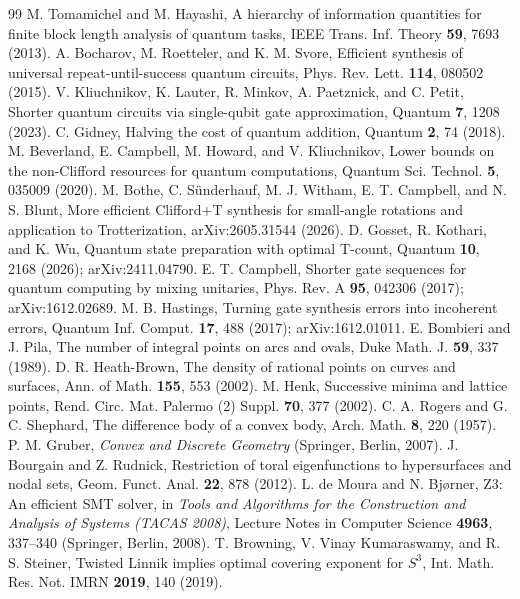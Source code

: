 \documentclass[aps,prx,twocolumn,superscriptaddress,nofootinbib,longbibliography]{revtex4-2}
\theoremstyle{plain}
\theoremstyle{definition}
\theoremstyle{remark}
\begin{document}
\begin{thebibliography}{99}
 M. Tomamichel and M. Hayashi, A hierarchy of information quantities for finite block length analysis of quantum tasks, IEEE Trans. Inf. Theory \textbf{59}, 7693 (2013).
 A. Bocharov, M. Roetteler, and K. M. Svore, Efficient synthesis of universal repeat-until-success quantum circuits, Phys. Rev. Lett. \textbf{114}, 080502 (2015).
 V. Kliuchnikov, K. Lauter, R. Minkov, A. Paetznick, and C. Petit, Shorter quantum circuits via single-qubit gate approximation, Quantum \textbf{7}, 1208 (2023).
 C. Gidney, Halving the cost of quantum addition, Quantum \textbf{2}, 74 (2018).
 M. Beverland, E. Campbell, M. Howard, and V. Kliuchnikov, Lower bounds on the non-Clifford resources for quantum computations, Quantum Sci. Technol. \textbf{5}, 035009 (2020).
 M. Bothe, C. S\"underhauf, M. J. Witham, E. T. Campbell, and N. S. Blunt, More efficient Clifford+T synthesis for small-angle rotations and application to Trotterization, arXiv:2605.31544 (2026).
 D. Gosset, R. Kothari, and K. Wu, Quantum state preparation with optimal T-count, Quantum \textbf{10}, 2168 (2026); arXiv:2411.04790.
 E. T. Campbell, Shorter gate sequences for quantum computing by mixing unitaries, Phys. Rev. A \textbf{95}, 042306 (2017); arXiv:1612.02689.
 M. B. Hastings, Turning gate synthesis errors into incoherent errors, Quantum Inf. Comput. \textbf{17}, 488 (2017); arXiv:1612.01011.
 E. Bombieri and J. Pila, The number of integral points on arcs and ovals, Duke Math. J. \textbf{59}, 337 (1989).
 D. R. Heath-Brown, The density of rational points on curves and surfaces, Ann. of Math. \textbf{155}, 553 (2002).
 M. Henk, Successive minima and lattice points, Rend. Circ. Mat. Palermo (2) Suppl. \textbf{70}, 377 (2002).
 C. A. Rogers and G. C. Shephard, The difference body of a convex body, Arch. Math. \textbf{8}, 220 (1957).
 P. M. Gruber, \emph{Convex and Discrete Geometry} (Springer, Berlin, 2007).
 J. Bourgain and Z. Rudnick, Restriction of toral eigenfunctions to hypersurfaces and nodal sets, Geom. Funct. Anal. \textbf{22}, 878 (2012).
 L. de Moura and N. Bj{\o}rner, Z3: An efficient SMT solver, in \emph{Tools and Algorithms for the Construction and Analysis of Systems (TACAS 2008)}, Lecture Notes in Computer Science \textbf{4963}, 337--340 (Springer, Berlin, 2008).
 T. Browning, V. Vinay Kumaraswamy, and R. S. Steiner, Twisted Linnik implies optimal covering exponent for $S^3$, Int. Math. Res. Not. IMRN \textbf{2019}, 140 (2019).

\end{thebibliography}
\end{document}
